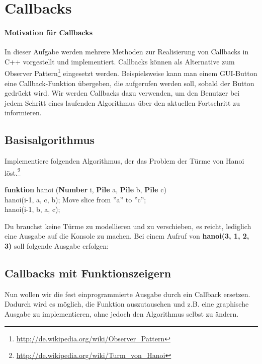 \section{\ExercisePrefixAdvanced Callbacks}

\paragraph*{Motivation für Callbacks}
In dieser Aufgabe werden mehrere Methoden zur Realisierung von Callbacks in C++ vorgestellt und implementiert.
Callbacks können als Alternative zum Observer Pattern\footnote{\url{http://de.wikipedia.org/wiki/Observer_Pattern}} eingesetzt werden.
Beispielsweise kann man einem GUI-Button eine Callback-Funktion übergeben, die aufgerufen werden soll, sobald der Button gedrückt wird.
Wir werden Callbacks dazu verwenden, um den Benutzer bei jedem Schritt eines laufenden Algorithmus über den aktuellen Fortschritt zu informieren.

\subsection{Basisalgorithmus}
Implementiere folgenden Algorithmus, der das Problem der Türme von Hanoi löst.\footnote{\url{http://de.wikipedia.org/wiki/Turm_von_Hanoi}}\\
\begin{algorithm}[H]
 \SetAlgoLined
 \textbf{funktion} hanoi (\textbf{Number} i, \textbf{Pile} a, \textbf{Pile} b, \textbf{Pile} c) { \\
      {
        hanoi(i-1, a, c, b); 
        Move slice from ''a'' to ''c''; \\
        hanoi(i-1, b, a, c); 
     }
 }
\end{algorithm}

Du brauchst keine Türme zu modellieren und zu verschieben, es reicht, lediglich eine Ausgabe auf die Konsole zu machen. Bei einem Aufruf von \textbf{hanoi(3, 1, 2, 3)} soll folgende Ausgabe erfolgen:



\subsection{Callbacks mit Funktionszeigern}
Nun wollen wir die fest einprogrammierte Ausgabe durch ein Callback ersetzen. Dadurch wird es möglich, die Funktion auszutauschen und z.B. eine graphische Ausgabe zu implementieren, ohne jedoch den Algorithmus selbst zu ändern.

